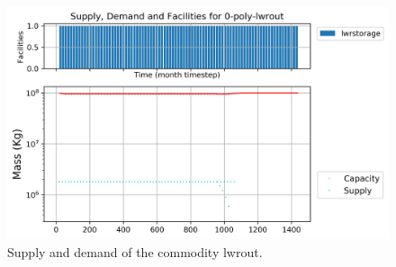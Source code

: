 \documentclass[11pt]{article}
\begin{document}
\begin{figure}[H]
	\centering
	\includegraphics[width=\textwidth]{29-figures/0-poly-lwrout.png} 
	\hfill
	\caption{Supply and demand of the commodity lwrout.}
	\label{fig:29-out1}
\end{figure}
\end{document}

